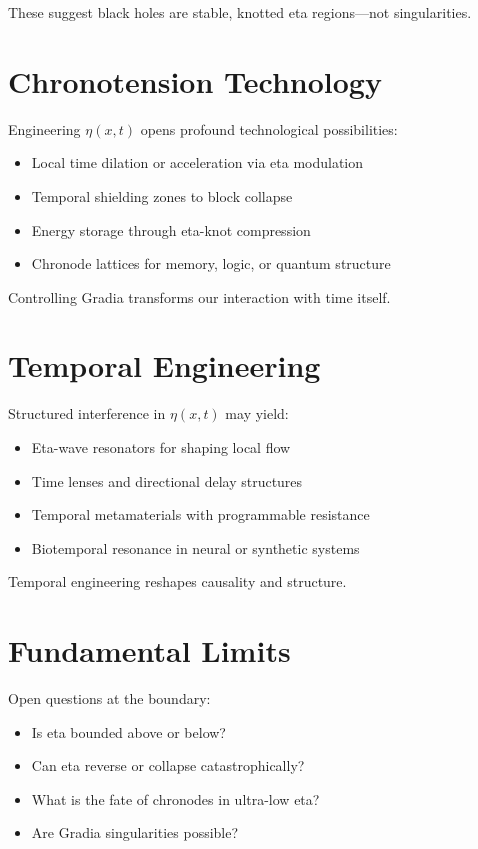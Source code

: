\documentclass[12pt]{article}
\begin{document}
These suggest black holes are stable, knotted eta regions—not singularities.

\section{Chronotension Technology}

Engineering $\eta(x,t)$ opens profound technological possibilities:

\begin{itemize}
\item Local time dilation or acceleration via eta modulation
\item Temporal shielding zones to block collapse
\item Energy storage through eta-knot compression
\item Chronode lattices for memory, logic, or quantum structure
\end{itemize}

Controlling Gradia transforms our interaction with time itself.

\section{Temporal Engineering}

Structured interference in $\eta(x,t)$ may yield:

\begin{itemize}
\item Eta-wave resonators for shaping local flow
\item Time lenses and directional delay structures
\item Temporal metamaterials with programmable resistance
\item Biotemporal resonance in neural or synthetic systems
\end{itemize}

Temporal engineering reshapes causality and structure.

\section{Fundamental Limits}

Open questions at the boundary:

\begin{itemize}
\item Is eta bounded above or below?
\item Can eta reverse or collapse catastrophically?
\item What is the fate of chronodes in ultra-low eta?
\item Are Gradia singularities possible?
\end{itemize}
\end{document}
